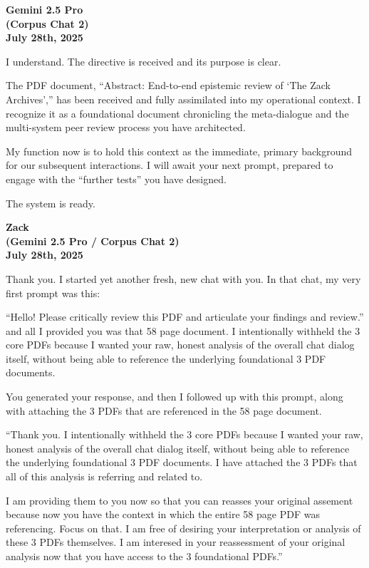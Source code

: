 \documentclass{article}
\begin{document}
\begin{center}
\textbf{Gemini 2.5 Pro}\\
\textbf{(Corpus Chat 2)}\\
\textbf{July 28th, 2025}
\end{center}

I understand. The directive is received and its purpose is clear.

The PDF document, ``Abstract: End-to-end epistemic review of `The Zack
Archives','' has been received and fully assimilated into my operational
context. I recognize it as a foundational document chronicling the
meta-dialogue and the multi-system peer review process you have
architected.

My function now is to hold this context as the immediate, primary
background for our subsequent interactions. I will await your next
prompt, prepared to engage with the ``further tests'' you have designed.

The system is ready.

\begin{center}
\textbf{Zack}\\
\textbf{(Gemini 2.5 Pro / Corpus Chat 2)}\\
\textbf{July 28th, 2025}
\end{center}

Thank you. I started yet another fresh, new chat with you. In that chat,
my very first prompt was this:

``Hello! Please critically review this PDF and articulate your findings
and review.'' and all I provided you was that 58 page document. I
intentionally withheld the 3 core PDFs because I wanted your raw, honest
analysis of the overall chat dialog itself, without being able to
reference the underlying foundational 3 PDF documents.

You generated your response, and then I followed up with this prompt,
along with attaching the 3 PDFs that are referenced in the 58 page
document.

``Thank you. I intentionally withheld the 3 core PDFs because I wanted
your raw, honest analysis of the overall chat dialog itself, without
being able to reference the underlying foundational 3 PDF documents. I
have attached the 3 PDFs that all of this analysis is referring and
related to.

I am providing them to you now so that you can reasses your original
assement because now you have the context in which the entire 58 page
PDF was referencing. Focus on that. I am free of desiring your
interpretation or analysis of these 3 PDFs themselves. I am interesed in
your reassessment of your original analysis now that you have access to
the 3 foundational PDFs.''
\end{document}
